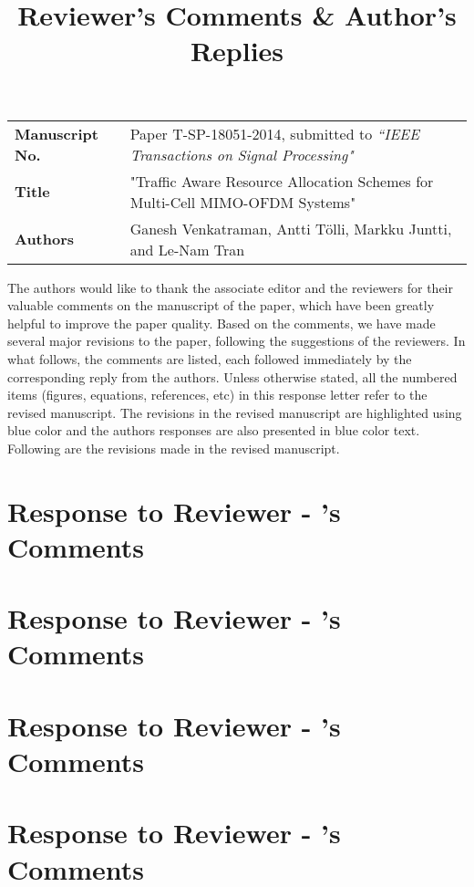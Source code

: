 \documentclass[11pt,letterpaper,onecolumn]{article}
\begin{document}
\title{Reviewer's Comments \& Author's Replies}

\maketitle

\begin{tabular}{p{1.5in}p{4in}}
\textbf{Manuscript No.} & Paper T-SP-18051-2014, submitted to \emph{``IEEE Transactions on Signal Processing"} \\
\textbf{Title} & "Traffic Aware Resource Allocation Schemes for Multi-Cell MIMO-OFDM Systems" \\
\textbf{Authors} & Ganesh Venkatraman, Antti T\"{o}lli, Markku Juntti, and Le-Nam Tran
\end{tabular}

\vspace{1in}
The authors would like to thank the associate editor and the reviewers for their valuable comments on the manuscript of the paper, which have been greatly helpful to improve the paper quality. Based on the comments, we have made several major revisions to the paper, following the suggestions of the reviewers. In what follows, the comments are listed, each followed immediately by the corresponding reply from the authors. Unless otherwise stated, all the numbered items (figures, equations, references, etc) in this response letter refer to the revised manuscript. The revisions in the revised manuscript are highlighted using blue color and the authors responses are also presented in blue color text. Following are the revisions made in the revised manuscript.


\newpage
\section*{Response to Reviewer - 's Comments}


\newpage
\section*{Response to Reviewer - 's Comments}


\newpage
\section*{Response to Reviewer - 's Comments}


\newpage
\section*{Response to Reviewer - 's Comments}

\end{document}

